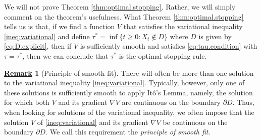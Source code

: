 \documentclass[12pt]{book}
\numberwithin{equation}{chapter}
\theoremstyle{plain}
\numberwithin{theorem}{section}
\theoremstyle{definition}
\newtheorem{remark}[theorem]{\underline{Remark}}
\numberwithin{exercise}{chapter}
\newcommand{\<}{\langle}
\renewcommand{\>}{\rangle}
\renewcommand{\(}{\left(}
\renewcommand{\)}{\right)}
\renewcommand{\[}{\left[}
\renewcommand{\]}{\right]}
\renewcommand\d{\partial}
\begin{document}
\noindent
We will not prove Theorem \ref{thm:optimal.stopping}.  Rather, we will simply comment on the theorem's usefulness.  What Theorem \ref{thm:optimal.stopping} tells us is that, if we find a function $V$ that satisfies the variational inequality \eqref{ineq:variational} and define $\tau^* = \inf \{ t \geq 0 : X_t \notin D \}$ where $D$ is given by \eqref{eq:D.explicit}, then if $V$ is sufficiently smooth and satisfies \eqref{eq:tau.condition} with $\tau = \tau^*$, then we can conclude that $\tau^*$ is the optimal stopping rule.  

\begin{remark}[Principle of smooth fit]
\label{rmk:smooth.fit}
There will often be more than one solution to the variational inequality \eqref{ineq:variational}.  Typically, however, only one of these solutions is sufficiently smooth to apply It\^o's Lemma, namely, the solution for which both $V$ and its gradient $\nabla V$ are continuous on the boundary $\d D$.  Thus, when looking for solutions of the variational inequality, we often impose that the solution $V$ of \eqref{ineq:variational} and its gradient $\nabla V$ be continuous on the boundary $\d D$.  We call this requirement the \emph{principle of smooth fit}.
\end{remark}
\end{document}
